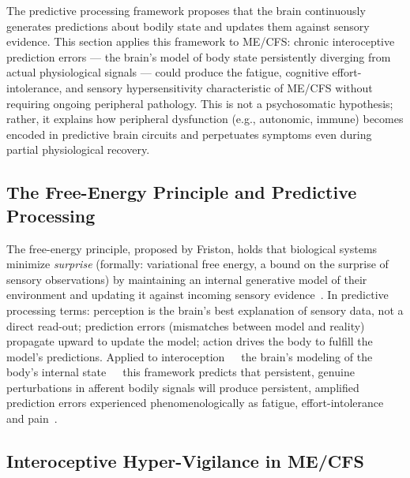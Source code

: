 The predictive processing framework proposes that the brain continuously generates predictions about bodily state and updates them against sensory evidence. This section applies this framework to ME/CFS: chronic interoceptive prediction errors --- the brain's model of body state persistently diverging from actual physiological signals --- could produce the fatigue, cognitive effort-intolerance, and sensory hypersensitivity characteristic of ME/CFS without requiring ongoing peripheral pathology. This is not a psychosomatic hypothesis; rather, it explains how peripheral dysfunction (e.g., autonomic, immune) becomes encoded in predictive brain circuits and perpetuates symptoms even during partial physiological recovery.

\subsection{The Free-Energy Principle and Predictive Processing}

The free-energy principle, proposed by Friston, holds that biological systems minimize \textit{surprise} (formally: variational free energy, a bound on the surprise of sensory observations) by maintaining an internal generative model of their environment and updating it against incoming sensory evidence~\cite{Friston2010FreeEnergy}. In predictive processing terms: perception is the brain's best explanation of sensory data, not a direct read-out; prediction errors (mismatches between model and reality) propagate upward to update the model; action drives the body to fulfill the model's predictions. Applied to interoception~~~the brain's modeling of the body's internal state~~~this framework predicts that persistent, genuine perturbations in afferent bodily signals will produce persistent, amplified prediction errors experienced phenomenologically as fatigue, effort-intolerance and pain~\cite{Friston2010FreeEnergy}.

\subsection{Interoceptive Hyper-Vigilance in ME/CFS}

